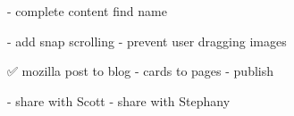 - complete content
 find name 

 - add snap scrolling
 - prevent user dragging images

 
 ✅ mozilla post to blog 
- cards to pages
- publish 

- share with Scott
- share with Stephany
